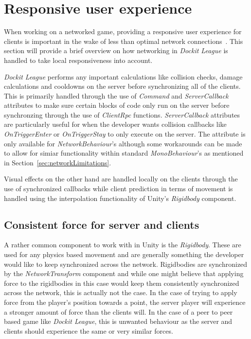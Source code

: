 \section{Responsive user experience}
When working on a networked game, providing a responsive user experience for clients is important in the wake of less than optimal network connections~\cite{bernier2001latency}. This section will provide a brief overview on how networking in \emph{Dockit League} is handled to take local responsiveness into account. 

\emph{Dockit League} performs any important calculations like collision checks, damage calculations and cooldowns on the server before synchronizing all of the clients. This is primarily handled through the use of \emph{Command} and \emph{ServerCallback} attributes to make sure certain blocks of code only run on the server before synchronzing through the use of \emph{ClientRpc} functions. \emph{ServerCallback} attributes are particularly useful for when the developer wants collision callbacks like \emph{OnTriggerEnter} or \emph{OnTriggerStay} to only execute on the server. The attribute is only available for \emph{NetworkBehaviour}'s although some workarounds can be made to allow for simiar functionality within standard \emph{MonoBehaviour}'s as mentioned in Section~\ref{sec:networkLimitations}.  

Visual effects on the other hand are handled locally on the clients through the use of synchronized callbacks while client prediction in terms of movement is handled using the interpolation functionality of Unity's \emph{Rigidbody} component.  

\subsection{Consistent force for server and clients}
\label{sec:conForce}
A rather common component to work with in Unity is the \emph{Rigidbody}. These are used for any physics based movement and are generally something the developer would like to keep synchronized across the network. Rigidbodies are synchronized by the \emph{NetworkTransform} component and while one might believe that applying force to the rigidbodies in this case would keep them consistently synchronized across the network, this is actually not the case. In the case of trying to apply force from the player's position towards a point, the server player will experience a stronger amount of force than the clients will. In the case of a peer to peer based game like \emph{Dockit League}, this is unwanted behaviour as the server and clients should experience the same or very similar forces.

